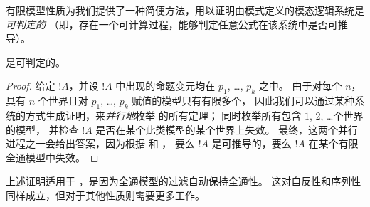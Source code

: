 \documentclass[../../../include/open-logic-section]{subfiles}
\begin{document}

有限模型性质为我们提供了一种简便方法，用以证明由模式定义的模态逻辑系统是\emph{可判定的}
（即，存在一个可计算过程，能够判定任意公式在该系统中是否可推导）。

\begin{thm}
   是可判定的。
\end{thm}

\begin{proof}
  给定 $!A$，并设 $!A$ 中出现的命题变元均在 $p_1$, \dots, $p_k$ 之中。
  由于对每个 $n$，具有 $n$ 个世界且对 $p_1$, \dots, $p_k$ 赋值的模型只有有限多个，
  因此我们可以通过某种系统的方式生成证明，来\emph{并行地}枚举  的所有定理；
  同时枚举所有包含 $1$, $2$, \dots 个世界的模型，
  并检查 $!A$ 是否在某个此类模型的某个世界上失效。
  最终，这两个并行进程之一会给出答案，因为根据
   和 ，
  要么 $!A$ 是可推导的，要么 $!A$ 在某个有限全通模型中失效。
\end{proof}

上述证明适用于 ，是因为全通模型的过滤自动保持全通性。
这对自反性和序列性同样成立，但对于其他性质则需要更多工作。
\end{document}
